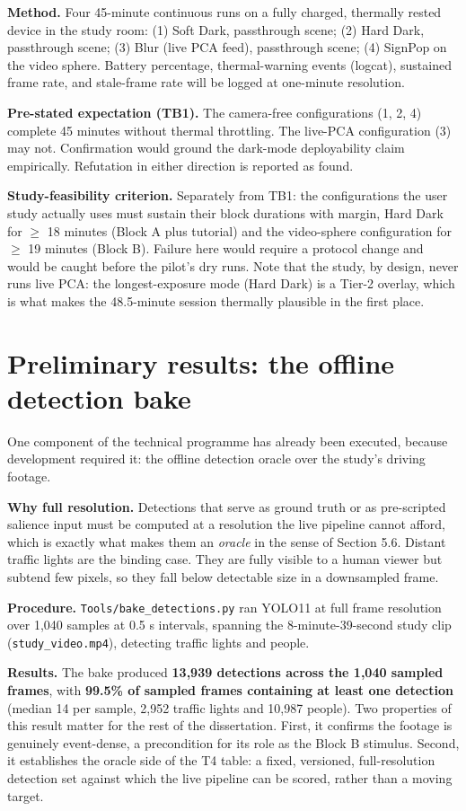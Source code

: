 \textbf{Method.} Four 45-minute continuous runs on a fully charged, thermally rested device in the study
room: (1) Soft Dark, passthrough scene; (2) Hard Dark, passthrough scene; (3) Blur (live PCA feed),
passthrough scene; (4) SignPop on the video sphere. Battery percentage, thermal-warning events
(logcat), sustained frame rate, and stale-frame rate will be logged at one-minute resolution.

\textbf{Pre-stated expectation (TB1).} The camera-free configurations (1, 2, 4) complete 45 minutes
without thermal throttling. The live-PCA configuration (3) may not. Confirmation would ground the
dark-mode deployability claim empirically. Refutation in either direction is reported as found.

\textbf{Study-feasibility criterion.} Separately from TB1: the configurations the user study actually
uses must sustain their block durations with margin, Hard Dark for $\geq$ 18 minutes (Block A plus
tutorial) and the video-sphere configuration for $\geq$ 19 minutes (Block B). Failure here would
require a protocol change and would be caught before the pilot's dry runs. Note that the study, by
design, never runs live PCA: the longest-exposure mode (Hard Dark) is a Tier-2 overlay, which is
what makes the 48.5-minute session thermally plausible in the first place.

\section{Preliminary results: the offline detection bake}

One component of the technical programme has already been executed, because development required
it: the offline detection oracle over the study's driving footage.

\textbf{Why full resolution.} Detections that serve as ground truth or as pre-scripted salience input
must be computed at a resolution the live pipeline cannot afford, which is exactly what makes them an
\textit{oracle} in the sense of Section 5.6. Distant traffic lights are the binding case. They are fully
visible to a human viewer but subtend few pixels, so they fall below detectable size in a downsampled
frame.

\textbf{Procedure.} \verb|Tools/bake_detections.py| ran YOLO11 at full frame resolution over 1,040
samples at 0.5 s intervals, spanning the 8-minute-39-second study clip (\verb|study_video.mp4|),
detecting traffic lights and people.

\textbf{Results.} The bake produced \textbf{13,939 detections across the 1,040 sampled frames}, with
\textbf{99.5\% of sampled frames containing at least one detection} (median 14 per sample, 2,952
traffic lights and 10,987 people). Two properties of this result matter for the
rest of the dissertation. First, it confirms the footage is genuinely event-dense, a precondition
for its role as the Block B stimulus. Second, it establishes the oracle side of the T4 table: a fixed, versioned, full-resolution
detection set against which the live pipeline can be scored, rather than a moving target.

